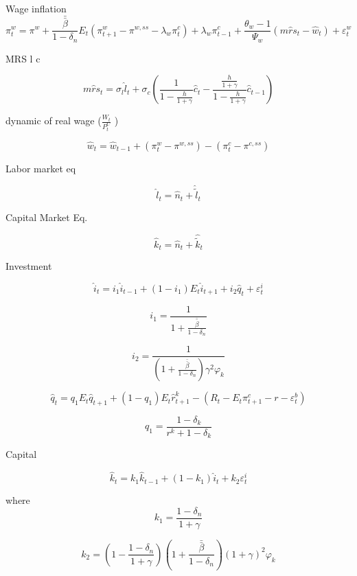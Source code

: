 \documentclass[11pt]{article}
\begin{document}
Wage inflation
\[
\pi _t^w = {\pi ^w} + \frac{{\bar \bar \beta }}{{1 - {\delta _n}}}{E_t}\left(
{\pi _{t + 1}^w - {\pi ^{w,ss}} - {\lambda _w}\pi _t^c} \right) + {\lambda _w}\pi
_{t - 1}^c + \frac{{{\theta _w} - 1}}{{{\Psi _w}}}\left( {m\hat r{s_t} - {{\hat
w}_t}} \right) + \varepsilon _t^w
\]


MRS l c 

\[
m\hat r{s_t} = {\sigma _l}{\hat l_t} + {\sigma _c}\left( {\frac{1}{{1 -
\frac{h}{{1 + \gamma }}}}{{\hat c}_t} - \frac{{\frac{h}{{1 + \gamma }}}}{{1 -
\frac{h}{{1 + \gamma }}}}{{\hat c}_{t - 1}}} \right)
\]


dynamic of real wage ($\frac{{{W_t}}}{{P_t^C}}$ )


\[
{\hat w_t} = {\hat w_{t - 1}} + \left( {\pi _t^w - {\pi ^{w,ss}}} \right) -
\left( {\pi _t^c - {\pi ^{c,ss}}} \right)
\]


Labor market eq

\[
{\hat l_t} = {\hat n_t} + {\hat \tilde l_t}
\]


Capital Market Eq.

\[
{\hat k_t} = {\hat n_t} + {\hat \tilde k_t}
\]

Investment

\[
{\hat i_t} = {i_1}{\hat i_{t - 1}} + (1 - {i_1}){E_t}{\hat i_{t + 1}} +
{i_2}{\hat q_t} + \varepsilon _t^i
\]



\[
{i_1} = \frac{1}{{1 + \frac{{\bar \bar \beta }}{{1 - {\delta _n}}}}}
\]



\[
{i_2} = \frac{1}{{\left( {1 + \frac{{\bar \bar \beta }}{{1 - {\delta _n}}}}
\right){\gamma ^2}{\varphi _k}}}
\]



\[
{\hat q_t} = {q_1}{E_t}{\hat q_{t + 1}} + (1 - {q_1}){E_t}\hat r_{t + 1}^k -
\left( {{R_t} - {E_t}\pi _{t + 1}^c - r - \varepsilon _t^b} \right)
\]



\[
{q_1} = \frac{{1 - {\delta _k}}}{{{r^k} + 1 - {\delta _k}}}
\]


Capital


\[
{\hat k_t} = {k_1}{\hat k_{t - 1}} + (1 - {k_1}){\hat i_t} + {k_2}\varepsilon
_t^i
\]


where 
\[
{k_1} = \frac{{1 - {\delta _n}}}{{1 + \gamma }}
\]



\[
{k_2} = \left( {1 - \frac{{1 - {\delta _n}}}{{1 + \gamma }}} \right)\left( {1 +
\frac{{\bar \bar \beta }}{{1 - {\delta _n}}}} \right){\left( {1 + \gamma }
\right)^2}{\varphi _k}
\]
\end{document}
